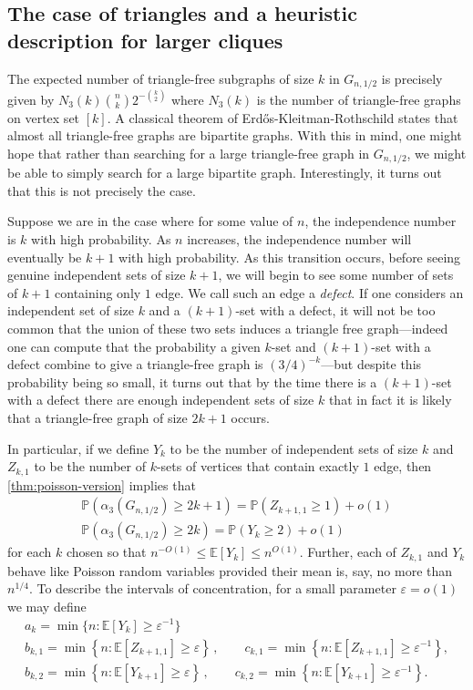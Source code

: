 \documentclass[11pt]{article}
\theoremstyle{definition}
\theoremstyle{remark}
\renewcommand{\epsilon}{\varepsilon}
\newcommand{\eps}{\epsilon}
\newcommand{\EE}{\mathbb{E}}
\newcommand{\E}{\mathbb{E}}
\newcommand{\PP}{\mathbb{P}}
\begin{document}
\subsection{The case of triangles and a heuristic description for larger cliques}\label{sec:triangles}

The expected number of triangle-free subgraphs of size $k$ in $G_{n,1/2}$ is precisely given by $N_3(k) \binom{n}{k}2^{-\binom{k}{2}}$ where $N_3(k)$ is the number of triangle-free graphs on vertex set $[k]$.  A classical theorem of Erd\H{o}s-Kleitman-Rothschild \cite{EKR} states that almost all triangle-free graphs are bipartite graphs.  With this in mind, one might hope that rather than searching for a large triangle-free graph in $G_{n,1/2}$, we might be able to simply search for a large bipartite graph.  Interestingly, it turns out that this is not precisely the case.

Suppose we are in the case where for some value of $n$, the independence number is $k$ with high probability.  As $n$ increases, the independence number will eventually be $k+1$ with high probability.  As this transition occurs, before seeing genuine independent sets of size $k+1$, we will begin to see some number of sets of $k+1$ containing only $1$ edge.  We call such an edge a \emph{defect}.  If one considers an independent set of size $k$ and a $(k+1)$-set with a defect, it will not be too common that the union of these two sets induces a triangle free graph---indeed one can compute that the probability a given $k$-set and $(k+1)$-set with a defect combine to give a triangle-free graph is $(3/4)^{-k}$---but despite this probability being so small, it turns out that by the time there is a $(k+1)$-set with a defect there are enough independent sets of size $k$ that in fact it is likely that a triangle-free graph of size $2k + 1$ occurs.  

In particular, if we define $Y_k$ to be the number of independent sets of size $k$ and $Z_{k,1}$ to be the number of $k$-sets of vertices that contain exactly $1$ edge, then \cref{thm:poisson-version} implies that \begin{gather*}
    \PP(\alpha_3(G_{n,1/2}) \geq 2k+1)  = \PP(Z_{k+1,1} \geq 1) + o(1) \\
    \PP(\alpha_3(G_{n,1/2}) \geq 2k)  = \PP(Y_{k} \geq 2) + o(1)
\end{gather*}
for each $k$ chosen so that $n^{-O(1)} \leq \E[Y_k] \leq n^{O(1)}.$  Further, each of $Z_{k,1}$ and $Y_k$ behave like Poisson random variables provided their mean is, say, no more than $n^{1/4}.$  To describe the intervals of concentration, for a small parameter $\eps = o(1)$ we may define \begin{gather*}
    a_k = \min\{ n : \E[Y_k] \geq \eps^{-1} \}\\
    b_{k,1} = \min\left\{ n : \EE  [Z_{k+1, 1}]\ge \epsilon \right\}\,, \qquad 
c_{k,1}  = \min\left\{ n : \EE  [Z_{k+1, 1}] \ge \epsilon^{-1} \right\},\\
 b_{k,2} = \min\left\{ n : \EE  [Y_{k+1}]\ge \epsilon \right\}\,, \qquad 
c_{k,2}  = \min\left\{ n : \EE  [Y_{k+1}] \ge \epsilon^{-1} \right\}.
\end{gather*}
\end{document}
